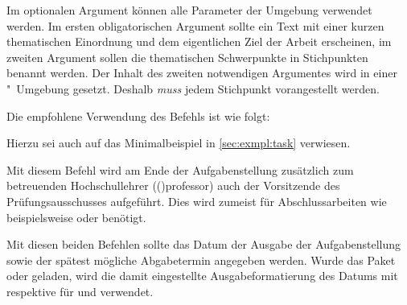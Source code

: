 \begin{DeclareEntity}{}
\begin{Declaration}
Im optionalen Argument können alle Parameter der Umgebung  
verwendet werden. Im ersten obligatorischen Argument sollte ein Text mit einer 
kurzen thematischen Einordnung und dem eigentlichen Ziel der Arbeit erscheinen, 
im zweiten Argument sollen die thematischen Schwerpunkte in Stichpunkten 
benannt werden. Der Inhalt des zweiten notwendigen Argumentes wird in einer 
"~Umgebung gesetzt. Deshalb \emph{muss} jedem Stichpunkt 
 vorangestellt werden.
\end{Declaration}
%
\begin{Example}
Die empfohlene Verwendung des Befehls  ist wie folgt:
\begin{Code}[escapechar=§]
\end{Code}
Hierzu sei auch auf das Minimalbeispiel in \autoref{sec:exmpl:task} verwiesen.%
%
\end{Example}

\begin{Declaration}
  {}
\printdeclarationlist
%
Mit diesem Befehl wird am Ende der Aufgabenstellung zusätzlich zum betreuenden 
Hochschullehrer (\Macro(){professor}) auch der Vorsitzende des 
Prüfungsausschusses aufgeführt. Dies wird zumeist für Abschlussarbeiten wie 
beispielsweise \masterthesisname{} oder \diplomathesisname{} benötigt.
\end{Declaration}

\begin{Declaration}
  {}
\begin{Declaration}
  {}
\printdeclarationlist
%
Mit diesen beiden Befehlen sollte das Datum der Ausgabe der Aufgabenstellung 
sowie der spätest mögliche Abgabetermin angegeben werden. Wurde das Paket 
 oder  geladen, wird die damit eingestellte 
Ausgabeformatierung des Datums mit  respektive  
für  und  verwendet.
\end{Declaration}
\end{Declaration}




\end{DeclareEntity}
